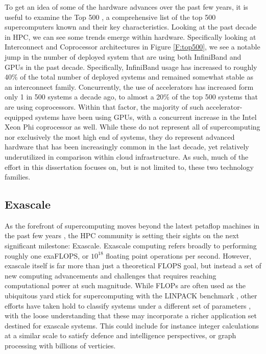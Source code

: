 To get an idea of some of the hardware advances over the past few years, it is useful to examine the Top 500 \cite{www-top500}, a comprehensive list of the top 500 supercomputers known and their key characteristics.  Looking at the past decade in HPC, we can see some trends emerge within hardware. Specifically looking at Interconnect and Coprocessor architectures in Figure \ref{F:top500}, we see a notable jump in the number of deployed system that are using both InfiniBand and GPUs in the past decade. Specifically, InfiniBand usage has increased to roughly 40\% of the total number of deployed systems and remained somewhat stable as an interconnect family. Concurrently, the use of accelerators has increased form only 1 in 500 systems a decade ago, to almost a 20\% of the top 500 systems that are using coprocessors. Within that factor, the majority of such accelerator-equipped systems have been using GPUs, with a concurrent increase in the Intel Xeon Phi coprocessor as well.  While these do not represent all of supercomputing nor exclusively the most high end of systems, they do represent advanced hardware that has been increasingly common in the last decade, yet relatively underutilized in comparison within cloud infrastructure. As such, much of the effort in this dissertation focuses on, but is not limited to,  these two technology families.    




\subsection{Exascale}

As the forefront of supercomputing moves beyond the latest petaflop machines in the past few years \cite{bland2012titan}, the HPC community is setting their sights on the next significant milestone: Exascale. Exascale computing refers broadly to performing roughly one exaFLOPS, or $10^{18}$ floating point operations per second. However, exascale itself is far more than just a theoretical FLOPS goal, but instead a set of new computing advancements and challenges that requires reaching computational power at such magnitude.  While FLOPs are often used as the ubiquitous yard stick for supercomputing with the LINPACK benchmark \cite{dongarra2003linpack}, other efforts have taken hold to classify systems under a different set of parameters \cite{murphy2010graph500, dongarra2013hpcg}, with the loose understanding that these may incorporate a richer application set destined for exascale systems.  This could include for instance integer calculations at a similar scale to satisfy defence and intelligence perspectives, or graph processing with billions of verticies.  

